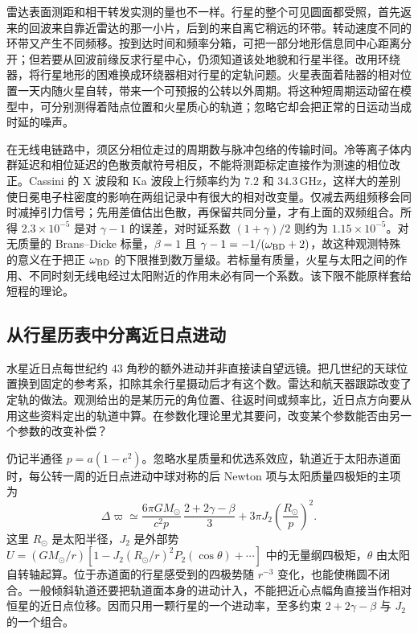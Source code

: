 雷达表面测距和相干转发实测的量也不一样。行星的整个可见圆面都受照，首先返来的回波来自靠近雷达的那一小片，后到的来自离它稍远的环带。转动速度不同的环带又产生不同频移。按到达时间和频率分箱，可把一部分地形信息同中心距离分开；但若要从回波前缘反求行星中心，仍须知道该处地貌和行星半径。改用环绕器，将行星地形的困难换成环绕器相对行星的定轨问题。火星表面着陆器的相对位置一天内随火星自转，带来一个可预报的公转以外周期。将这种短周期运动留在模型中，可分别测得着陆点位置和火星质心的轨道；忽略它却会把正常的日运动当成时延的噪声。

在无线电链路中，须区分相位走过的周期数与脉冲包络的传输时间。冷等离子体内群延迟和相位延迟的色散贡献符号相反，不能将测距标定直接作为测速的相位改正。Cassini 的 X 波段和 Ka 波段上行频率约为 $7.2$ 和 $34.3\,\mathrm{GHz}$，这样大的差别使日冕电子柱密度的影响在两组记录中有很大的相对改变量。仅减去两组频移会同时减掉引力信号；先用差值估出色散，再保留共同分量，才有上面的双频组合。所得 $2.3\times10^{-5}$ 是对 $\gamma-1$ 的误差，对时延系数 $(1+\gamma)/2$ 则约为 $1.15\times10^{-5}$。对无质量的 Brans--Dicke 标量，$\beta=1$ 且 $\gamma-1=-1/(\omega_{\rm BD}+2)$，故这种观测特殊的意义在于把正 $\omega_{\rm BD}$ 的下限推到数万量级。若标量有质量，火星与太阳之间的作用、不同时刻无线电经过太阳附近的作用未必有同一个系数。该下限不能原样套给短程的理论。

\subsection{从行星历表中分离近日点进动}\label{sec:pn-ephemeris}

水星近日点每世纪约 $43$ 角秒的额外进动并非直接读自望远镜。把几世纪的天球位置换到固定的参考系，扣除其余行星摄动后才有这个数。雷达和航天器跟踪改变了定轨的做法。观测给出的是某历元的角位置、往返时间或频率比，近日点方向要从用这些资料定出的轨道中算。在参数化理论里尤其要问，改变某个参数能否由另一个参数的改变补偿？

仍记半通径 $p=a(1-e^2)$。忽略水星质量和优选系效应，轨道近于太阳赤道面时，每公转一周的近日点进动中球对称的后 Newton 项与太阳质量四极矩的主项为
\[
    \Delta\varpi\simeq\frac{6\pi GM_\odot}{c^2p}\,
          \frac{2+2\gamma-\beta}{3}
           +3\pi J_2\left(\frac{R_\odot}{p}\right)^2 .
\]
这里 $R_\odot$ 是太阳半径，$J_2$ 是外部势 $U=(GM_\odot/r)[1-J_2(R_\odot/r)^2P_2(\cos\theta)+\cdots]$ 中的无量纲四极矩，$\theta$ 由太阳自转轴起算。位于赤道面的行星感受到的四极势随 $r^{-3}$ 变化，也能使椭圆不闭合。一般倾斜轨道还要把轨道面本身的进动计入，不能把近心点幅角直接当作相对恒星的近日点位移。因而只用一颗行星的一个进动率，至多约束 $2+2\gamma-\beta$ 与 $J_2$ 的一个组合。

